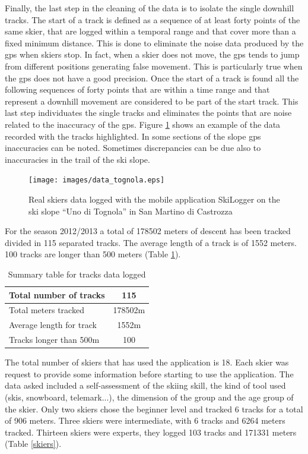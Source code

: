 \documentclass[12pt,a4paper,twoside]{book}
\begin{document}
Finally, the last step in the cleaning of the data is to isolate the single downhill tracks. The start of a track is defined as a sequence of at least forty points of the same skier, that are logged within a temporal range and that cover more than a fixed minimum distance. This is done to eliminate the noise data produced by the gps when skiers stop. In fact, when a skier does not move, the gps tends to jump from different positions generating false movement. This is particularly true when the gps does not have a good precision. Once the start of a track is found all the following sequences of forty points that are within a time range and that represent a downhill movement are considered to be part of the start track. This last step individuates the single tracks and eliminates the points that are noise related to the inaccuracy of the gps. Figure \ref{data_tognola} shows an example of the data recorded with the tracks highlighted. In some sections of the slope gps inaccuracies can be noted. Sometimes discrepancies can be due also to inaccuracies in the trail of the ski slope.

\begin{figure}
  \begin{center}
    \texttt{[image: images/data\_tognola.eps]}
    \caption{Real skiers data logged with the mobile application SkiLogger on the ski slope ``Uno di Tognola'' in San Martino di Castrozza}\label{data_tognola}
  \end{center}
\end{figure}

For the season 2012/2013 a total of 178502 meters of descent has been tracked divided in 115 separated tracks. The average length of a track is of 1552 meters. 100 tracks are longer than 500 meters (Table \ref{descendts}).

\begin{table}[!h]
  \centering
  \begin{tabular}{ | l | c | }
    \hline
    Total number of tracks & 115 \\ \hline
    Total meters tracked & 178502m \\ \hline
    Average length for track & 1552m \\ \hline
    Tracks longer than 500m & 100 \\
    \hline
  \end{tabular}
  \caption{Summary table for tracks data logged}
  \label{descendts}
\end{table}

The total number of skiers that has used the application is 18. Each skier was request to provide some information before starting to use the application. The data asked included a self-assessment of the skiing skill, the kind of tool used (skis, snowboard, telemark...), the dimension of the group and the age group of the skier. Only two skiers chose the beginner level and tracked 6 tracks for a total of 906 meters. Three skiers were intermediate, with 6 tracks and 6264 meters tracked. Thirteen skiers were experts, they logged 103 tracks and 171331 meters (Table \ref{skiers}).
\end{document}
